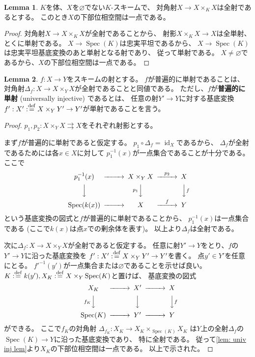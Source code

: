 \documentclass[uplatex]{jsarticle}
\theoremstyle{definition}
\newtheorem{lem}[lem]{Lemma}
\DeclareMathOperator{\id}{\mathrm{id}}
\DeclareMathOperator{\Spec}{\mathrm{Spec}}
\renewcommand{\emptyset}{\varnothing}
\newcommand{\dfn}{:\overset{\mathrm{\scriptsize def}}{=}}
\begin{document}
\begin{lem}\label{lem: univ inj lem}
  \(K\)を体、\(X\)を\(\emptyset\)でない\(K\)-スキームで、
  対角射\(X\to X\times_KX\)は全射であるとする。
  このとき\(X\)の下部位相空間は一点である。
\end{lem}

\begin{proof}
  対角射\(X\to X\times_KX\)が全射であることから、
  射影\(X\times_KX\to X\)は全単射、とくに単射である。
  \(X\to \Spec(K)\)は忠実平坦であるから、
  \(X\to\Spec(K)\)は忠実平坦基底変換のあと単射となる射であり、
  従って単射である。
  \(X\neq \emptyset\)であるから、\(X\)の下部位相空間は一点である。
\end{proof}


\begin{lem}\label{lem: univ inj}
  \(f:X\to Y\)をスキームの射とする。
  \(f\)が普遍的に単射であることは、
  対角射\(\Delta_f:X\to X\times_YX\)が全射であることと同値である。
  ただし、\(f\)が\textbf{普遍的に単射} (universally injective) であるとは、
  任意の射\(Y'\to Y\)に対する基底変換
  \(f':X'\dfn X\times_YY'\to Y'\)が単射であることを言う。
\end{lem}

\begin{proof}
  \(p_1,p_2:X\times_YX\rightrightarrows X\)をそれぞれ射影とする。

  まず\(f\)が普遍的に単射であると仮定する。
  \(p_1\circ \Delta_f=\id_X\)であるから、
  \(\Delta_f\)が全射であるためには各\(x\in X\)に対して
  \(p_1^{-1}(x)\)が一点集合であることが十分である。
  ここで
  \[
  \begin{CD}
    p_1^{-1}(x) @>>> X\times_YX @>p_2>> X \\
    @VVV @Vp_1VV @VVfV \\
    \Spec(k(x)) @>>> X @>f>> Y
  \end{CD}
  \]
  という基底変換の図式と\(f\)が普遍的に単射であることから、
  \(p_1^{-1}(x)\)は一点集合である
  (ここで\(k(x)\)は点\(x\)での剰余体を表す)。
  以上より\(\Delta_f\)は全射である。

  次に\(\Delta_f:X\to X\times_YX\)が全射であると仮定する。
  任意に射\(Y'\to Y\)をとり、\(f\)の\(Y'\to Y\)に沿った基底変換を
  \(f':X'\dfn X\times_YY'\to Y'\)を書く。
  点\(y'\in Y'\)を任意にとる。
  \(f'^{-1}(y')\)が一点集合または\(\emptyset\)であることを示せば良い。
  \(K\dfn k(y') , X_K\dfn X\times_Y\Spec(K)\)と置けば、
  基底変換の図式
  \[
  \begin{CD}
    X_K @>>> X' @>>> X \\
    @Vf_KVV @VVV @VVfV \\
    \Spec(K) @>>> Y' @>>> Y
  \end{CD}
  \]
  ができる。
  ここで\(f_K\)の対角射
  \(\Delta_{f_K}:X_K\to X_K\times_{\Spec(K)}X_K\)
  は\(Y\)上の全射\(\Delta_f\)の\(\Spec(K)\to Y\)に沿った基底変換であり、
  特に全射である。
  従って\autoref{lem: univ inj lem}より\(X_K\)の下部位相空間は一点である。
  以上で示された。
\end{proof}
\end{document}
